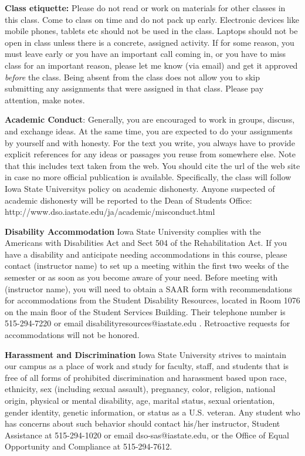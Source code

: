 \documentclass[11pt,a4paper]{article}
\begin{document}
\bigskip\textbf{\large Class etiquette:} Please do not read or work on materials for other classes in this class. Come to class on time and
do not pack up early. Electronic devices like mobile phones, tablets etc should not be used in the class. Laptops should not be open in class unless there is a concrete, assigned activity. If for some reason, you must leave early or you have an important call coming in, or you have to miss class for an important reason, please let me know (via email) and get it approved \emph{before} the class. Being absent from the class does not allow you to skip submitting any assignments that were assigned in that class. Please pay attention, make notes. 

\bigskip\textbf{\large Academic Conduct}: Generally, you are encouraged to work in groups, discuss, and exchange ideas. At the same time, you are expected to do your assignments by yourself and with honesty. For the text you write, you always have to provide explicit references for any ideas or passages you reuse from somewhere else. Note that this includes text taken from the web. You should cite the url of the web site in case no more official publication is available. Specifically, the class will follow Iowa State Universitys policy on academic dishonesty. Anyone suspected of academic dishonesty will be reported to the Dean of Students Office: http://www.dso.iastate.edu/ja/academic/misconduct.html

\bigskip\textbf{\large Disability Accommodation}
Iowa State University complies with the Americans with Disabilities Act and Sect 504 of the Rehabilitation Act. If you have a disability and anticipate needing accommodations in this course, please contact (instructor name) to set up a meeting within the first two weeks of the semester or as soon as you become aware of your need.  Before meeting with (instructor name), you will need to obtain a SAAR form with recommendations for accommodations from the Student Disability Resources, located in Room 1076 on the main floor of the Student Services Building. Their telephone number is 515-294-7220 or email disabilityresources@iastate.edu .  Retroactive requests for accommodations will not be honored.

\bigskip\textbf{\large Harassment and Discrimination}
Iowa State University strives to maintain our campus as a place of work and study for faculty, staff, and students that is free of all forms of prohibited discrimination and harassment based upon race, ethnicity, sex (including sexual assault), pregnancy, color, religion, national origin, physical or mental disability, age, marital status, sexual orientation, gender identity, genetic information, or status as a U.S. veteran. Any student who has concerns about such behavior should contact his/her instructor, Student Assistance at 515-294-1020 or email dso-sas@iastate.edu, or the Office of Equal Opportunity and Compliance at 515-294-7612.
\end{document}

